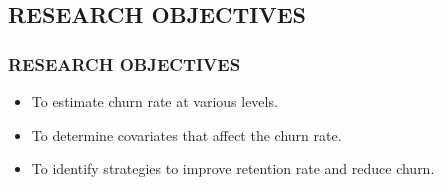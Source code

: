 \documentclass[12pt]{beamer}
\begin{document}
\begin{frame}
    \section{RESEARCH OBJECTIVES}

    \frametitle{RESEARCH OBJECTIVES}
    \begin{itemize}
        \item To estimate churn rate at various levels.
        \vspace{0.3cm}
        \item To determine covariates that affect the churn rate.
                \vspace{0.3cm}

        \item To identify strategies to improve retention rate and reduce churn.
                \vspace{0.3cm}

    \end{itemize}
    

\end{frame}

    

    
	
	
\end{document}
